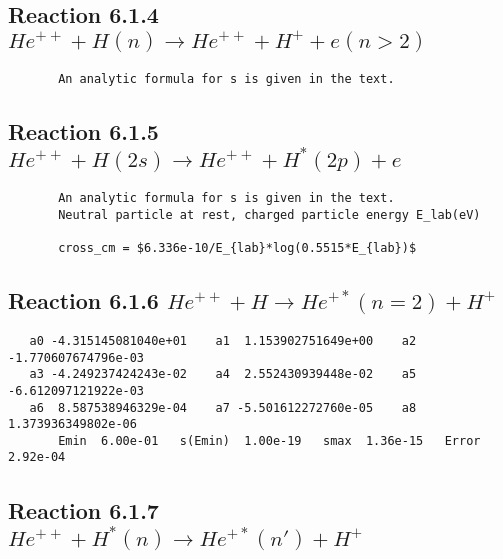 \documentclass[12pt]{article}
\begin{document}
\newpage
\subsection{
Reaction 6.1.4 $   He^{++} + H(n) \rightarrow  He^{++} + H^+ + e   (n > 2)$}

\begin{small}\begin{verbatim}
       An analytic formula for s is given in the text.
\end{verbatim}\end{small}

\newpage
\subsection{
Reaction 6.1.5 $   He^{++} + H(2s) \rightarrow  He^{++} + H^*(2p) + e   $}

\begin{small}\begin{verbatim}
       An analytic formula for s is given in the text.
       Neutral particle at rest, charged particle energy E_lab(eV)

       cross_cm = $6.336e-10/E_{lab}*log(0.5515*E_{lab})$
\end{verbatim}\end{small}

\newpage
\subsection{
Reaction 6.1.6 $   He^{++} + H \rightarrow He^{+*}(n=2) + H^+$}


\begin{small}\begin{verbatim}
   a0 -4.315145081040e+01    a1  1.153902751649e+00    a2 -1.770607674796e-03
   a3 -4.249237424243e-02    a4  2.552430939448e-02    a5 -6.612097121922e-03
   a6  8.587538946329e-04    a7 -5.501612272760e-05    a8  1.373936349802e-06
       Emin  6.00e-01   s(Emin)  1.00e-19   smax  1.36e-15   Error  2.92e-04
\end{verbatim}\end{small}

\newpage
\subsection{
Reaction 6.1.7 $   He^{++} + H^*(n) \rightarrow  He^{+*}(n') + H^+$}
\end{document}
